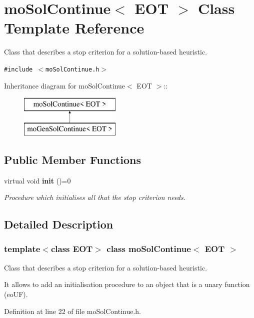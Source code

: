 \section{mo\-Sol\-Continue$<$ EOT $>$ Class Template Reference}
\label{classmo_sol_continue}
Class that describes a stop criterion for a solution-based heuristic.  


{\tt \#include $<$mo\-Sol\-Continue.h$>$}

Inheritance diagram for mo\-Sol\-Continue$<$ EOT $>$::\begin{figure}[H]
\begin{center}
\leavevmode
\includegraphics[height=2cm]{classmo_sol_continue}
\end{center}
\end{figure}
\subsection*{Public Member Functions}
\begin{CompactItemize}
\item 
virtual void {\bf init} ()=0
\begin{CompactList}\small\item\em Procedure which initialises all that the stop criterion needs. \item\end{CompactList}\end{CompactItemize}


\subsection{Detailed Description}
\subsubsection*{template$<$class EOT$>$ class mo\-Sol\-Continue$<$ EOT $>$}

Class that describes a stop criterion for a solution-based heuristic. 

It allows to add an initialisation procedure to an object that is a unary function (eo\-UF). 



Definition at line 22 of file mo\-Sol\-Continue.h.

